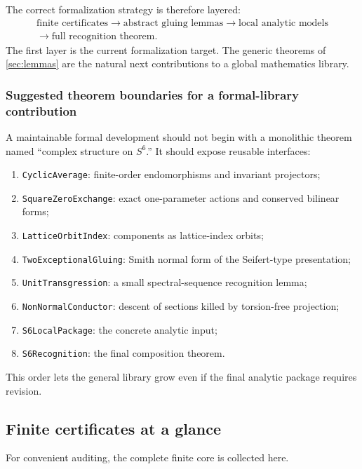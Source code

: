 \documentclass[11pt,reqno]{amsart}
\numberwithin{equation}{section}
\theoremstyle{definition}
\begin{document}
The correct formalization strategy is therefore layered:
\[
\begin{gathered}
\text{finite certificates}
\longrightarrow
\text{abstract gluing lemmas}
\longrightarrow
\text{local analytic models}
\\[-1pt]
\longrightarrow
\text{full recognition theorem}.
\end{gathered}
\]
The first layer is the current formalization target. The generic theorems of \cref{sec:lemmas} are the natural next contributions to a global mathematics library.

\subsubsection{Suggested theorem boundaries for a formal-library contribution}

A maintainable formal development should not begin with a monolithic theorem named ``complex structure on $S^6$.'' It should expose reusable interfaces:
\begin{enumerate}
\item \texttt{CyclicAverage}: finite-order endomorphisms and invariant projectors;
\item \texttt{SquareZeroExchange}: exact one-parameter actions and conserved bilinear forms;
\item \texttt{LatticeOrbitIndex}: components as lattice-index orbits;
\item \texttt{TwoExceptionalGluing}: Smith normal form of the Seifert-type presentation;
\item \texttt{UnitTransgression}: a small spectral-sequence recognition lemma;
\item \texttt{NonNormalConductor}: descent of sections killed by torsion-free projection;
\item \texttt{S6LocalPackage}: the concrete analytic input;
\item \texttt{S6Recognition}: the final composition theorem.
\end{enumerate}
This order lets the general library grow even if the final analytic package requires revision.


\subsection{Finite certificates at a glance}\label{sec:certificates}


For convenient auditing, the complete finite core is collected here.
\end{document}
